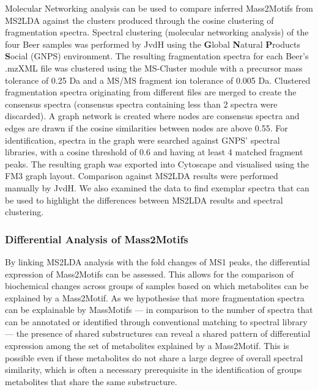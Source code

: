 Molecular Networking \cite{yang2013molecular, nguyen2013ms, van2016urinary} analysis can be used to compare inferred Mass2Motifs from MS2LDA against the clusters produced through the cosine clustering of fragmentation spectra. Spectral clustering (molecular networking analysis) of the four Beer samples was performed by JvdH using the \textbf{G}lobal \textbf{N}atural \textbf{P}roducts \textbf{S}ocial (GNPS) environment. The resulting fragmentation spectra for each Beer's .mzXML file was clustered using the MS-Cluster module with a precursor mass tolerance of 0.25 Da and a MS/MS fragment ion tolerance of 0.005 Da. Clustered fragmentation spectra originating from different files are merged to create the consensus spectra (consensus spectra containing less than 2 spectra were discarded). A graph network is created where nodes are consensus spectra and edges are drawn if the cosine similarities between nodes are above 0.55. For identification, spectra in the graph were searched against GNPS' spectral libraries, with a cosine threshold of 0.6 and having at least 4 matched fragment peaks. The resulting graph was exported into Cytoscape and visualised using the FM3 graph layout. Comparison against MS2LDA results were performed manually by JvdH. We also examined the data to find exemplar spectra that can be used to highlight the differences between MS2LDA results and spectral clustering.

\subsubsection{Differential Analysis of Mass2Motifs}

By linking MS2LDA analysis with the fold changes of MS1 peaks, the differential expression of Mass2Motifs can be assessed. This allows for the comparison of biochemical changes across groups of samples based on which metabolites can be explained by a Mass2Motif. As we hypothesise that more fragmentation spectra can be explainable by MassMotifs --- in comparison to the number of spectra that can be annotated or identified through conventional matching to spectral library --- the presence of shared substructures can reveal a shared pattern of differential expression among the set of metabolites explained by a Mass2Motif. This is possible even if these metabolites do not share a large degree of overall spectral similarity, which is often a necessary prerequisite in the identification of groups metabolites that share the same substructure. 

